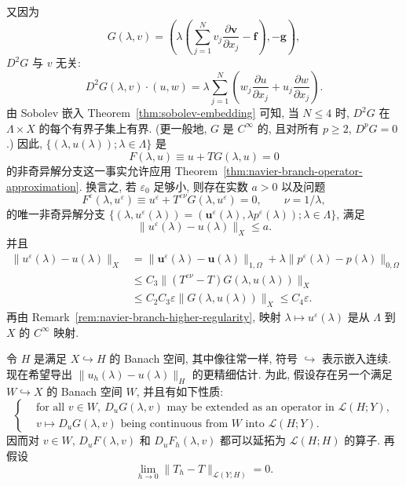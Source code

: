 \begin{Proof}
又因为
\[
G(\lambda,v)=
\left(\lambda\left(\sum_{j=1}^{N}v_j
\frac{\partial\boldsymbol v}{\partial x_j}-\boldsymbol f\right),
-\boldsymbol g\right),
\]
$D^2G$ 与 $v$ 无关:
\[
D^2G(\lambda,v)\cdot(u,w)
=\lambda\sum_{j=1}^{N}\left(
w_j\frac{\partial u}{\partial x_j}
+u_j\frac{\partial w}{\partial x_j}\right).
\]
由 Sobolev 嵌入 Theorem~\ref{thm:sobolev-embedding} 可知, 当 $N\leq4$ 时,
$D^2G$ 在 $\Lambda\times X$ 的每个有界子集上有界.
(更一般地, $G$ 是 $C^\infty$ 的, 且对所有 $p\geq2$, $D^pG=0$.)
因此, $\{(\lambda,u(\lambda));\lambda\in\Lambda\}$ 是
\[
F(\lambda,u)\equiv u+TG(\lambda,u)=0
\]
的非奇异解分支这一事实允许应用
Theorem~\ref{thm:navier-branch-operator-approximation}. 换言之, 若
$\varepsilon_0$ 足够小, 则存在实数 $a>0$ 以及问题
\[
F^\varepsilon(\lambda,u^\varepsilon)
\equiv u^\varepsilon+T^{\varepsilon\nu}G(\lambda,u^\varepsilon)=0,
\qquad \nu=1/\lambda,
\]
的唯一非奇异解分支
$\{(\lambda,u^\varepsilon(\lambda))
=(\boldsymbol u^\varepsilon(\lambda),\lambda p^\varepsilon(\lambda));
\lambda\in\Lambda\}$, 满足
\[
\|u^\varepsilon(\lambda)-u(\lambda)\|_X\leq a.
\]
并且
\begin{align*}
\|u^\varepsilon(\lambda)-u(\lambda)\|_X
&=\|\boldsymbol u^\varepsilon(\lambda)-\boldsymbol u(\lambda)\|_{1,\Omega}
+\lambda\|p^\varepsilon(\lambda)-p(\lambda)\|_{0,\Omega}\\
&\leq C_3\|(T^{\varepsilon\nu}-T)G(\lambda,u(\lambda))\|_X\\
&\leq C_2C_3\varepsilon\|G(\lambda,u(\lambda))\|_X
\leq C_4\varepsilon.
\end{align*}
再由 Remark~\ref{rem:navier-branch-higher-regularity}, 映射
$\lambda\mapsto u^\varepsilon(\lambda)$ 是从 $\Lambda$ 到 $X$ 的 $C^\infty$ 映射.
\end{Proof}

令 $H$ 是满足 $X\hookrightarrow H$ 的 Banach 空间, 其中像往常一样,
符号 $\hookrightarrow$ 表示嵌入连续. 现在希望导出
$\|u_h(\lambda)-u(\lambda)\|_H$ 的更精细估计. 为此, 假设存在另一个满足
$W\hookrightarrow X$ 的 Banach 空间 $W$, 并且有如下性质:
\begin{equation}\label{eq:navier-branch-extended-derivative}
\left\{
\begin{aligned}
&\text{for all }v\in W,\ D_uG(\lambda,v)\text{ may be extended as an operator in }\mathcal L(H;Y),\\
&v\mapsto D_uG(\lambda,v)\text{ being continuous from }W\text{ into }\mathcal L(H;Y).
\end{aligned}
\right.
\end{equation}
因而对 $v\in W$, $D_uF(\lambda,v)$ 和 $D_uF_h(\lambda,v)$ 都可以延拓为
$\mathcal L(H;H)$ 的算子. 再假设
\begin{equation}\label{eq:navier-branch-h-operator-convergence}
\lim_{h\to0}\|T_h-T\|_{\mathcal L(Y;H)}=0.
\end{equation}

